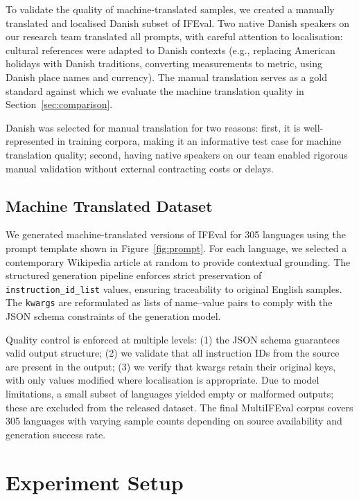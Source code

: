 \documentclass[11pt]{article}
\begin{document}
To validate the quality of machine-translated samples, we created a manually translated
and localised Danish subset of IFEval. Two native Danish speakers on our research team
translated all prompts, with careful attention to localisation: cultural references
were adapted to Danish contexts (e.g., replacing American holidays with Danish
traditions, converting measurements to metric, using Danish place names and currency).
The manual translation serves as a gold standard against which we evaluate the machine
translation quality in Section~\ref{sec:comparison}.

Danish was selected for manual translation for two reasons: first, it is well-represented
in training corpora, making it an informative test case for machine translation
quality; second, having native speakers on our team enabled rigorous manual validation
without external contracting costs or delays.

\subsection{Machine Translated Dataset}
\label{sec:mt-dataset}

We generated machine-translated versions of IFEval for 305 languages using the prompt
template shown in Figure~\ref{fig:prompt}. For each language, we selected a
contemporary Wikipedia article at random to provide contextual grounding. The
structured generation pipeline enforces strict preservation of \texttt{instruction\_id\_list}
values, ensuring traceability to original English samples. The \texttt{kwargs} are
reformulated as lists of name--value pairs to comply with the JSON schema constraints
of the generation model.

Quality control is enforced at multiple levels: (1) the JSON schema guarantees valid
output structure; (2) we validate that all instruction IDs from the source are present
in the output; (3) we verify that kwargs retain their original keys, with only values
modified where localisation is appropriate. Due to model limitations, a small subset
of languages yielded empty or malformed outputs; these are excluded from the released
dataset. The final MultiIFEval corpus covers 305 languages with varying sample counts
depending on source availability and generation success rate.


\section{Experiment Setup}
\label{sec:evaluation}
\end{document}
